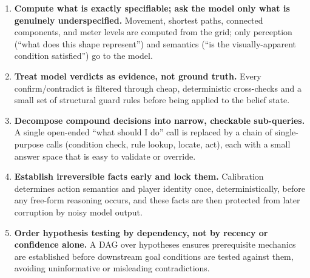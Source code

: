 \documentclass{article}
\begin{document}
\begin{enumerate}[nosep]
\item \textbf{Compute what is exactly specifiable; ask the model only
what is genuinely underspecified.} Movement, shortest paths, connected
components, and meter levels are computed from the grid; only
perception (``what does this shape represent'') and semantics
(``is the visually-apparent condition satisfied'') go to the model.
\item \textbf{Treat model verdicts as evidence, not ground truth.}
Every confirm/contradict is filtered through cheap, deterministic
cross-checks and a small set of structural guard rules before being
applied to the belief state.
\item \textbf{Decompose compound decisions into narrow, checkable
sub-queries.} A single open-ended ``what should I do'' call is
replaced by a chain of single-purpose calls (condition check, rule
lookup, locate, act), each with a small answer space that is easy to
validate or override.
\item \textbf{Establish irreversible facts early and lock them.}
Calibration determines action semantics and player identity once,
deterministically, before any free-form reasoning occurs, and these
facts are then protected from later corruption by noisy model output.
\item \textbf{Order hypothesis testing by dependency, not by
recency or confidence alone.} A DAG over hypotheses ensures
prerequisite mechanics are established before downstream goal
conditions are tested against them, avoiding uninformative or
misleading contradictions.
\end{enumerate}
\end{document}
